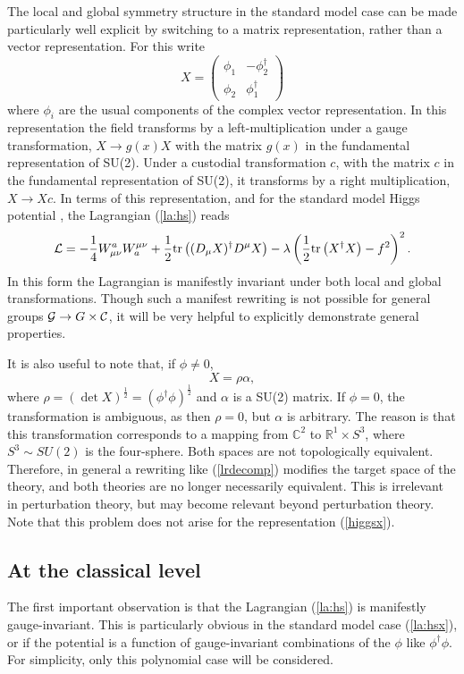 \documentclass[final,12pt]{article}
\newcommand*{\La}{{\cal{L}}}
\newcommand*{\no}{\noindent}
\newcommand*{\be}{\begin{equation}}
\newcommand*{\ee}{\end{equation}}
\newcommand*{\pref}[1]{(\ref{#1})}
\newcommand*{\mn}{{\mu\nu}}
\newcommand*{\tr}{\mathrm{tr}}
\newcommand*{\1}{1\!\!\!\bot}
\newcommand*{\bma}{\begin{matrix}}
\newcommand*{\ema}{\end{matrix}}
\newcommand*{\bpm}{\left(\bma}
\newcommand*{\epm}{\ema\right)}
\newcommand*{\rn}{\mathbb{R}}
\newcommand*{\cn}{\mathbb{C}}
\begin{document}
The local and global symmetry structure in the standard model case can be made particularly well explicit by switching to a matrix representation, rather than a vector representation. For this write \cite{Shifman:2012zz}
\be
X=\bpm \phi_1 & -\phi_2^\dagger\\ \phi_2 & \phi_1^\dagger \epm\label{higgsx}
\ee
\no where $\phi_i$ are the usual components of the complex vector representation. In this representation the field transforms by a left-multiplication under a gauge transformation, $X\to g(x)X$ with the matrix $g(x)$ in the fundamental representation of SU(2). Under a custodial transformation $c$, with the matrix $c$ in the fundamental representation of SU(2), it transforms by a right multiplication, $X\to X c$. In terms of this representation, and for the standard model Higgs potential \cite{Bohm:2001yx}, the Lagrangian \pref{la:hs} reads \cite{Shifman:2012zz}
\be
\La=-\frac{1}{4}W_\mn^aW^\mn_a+\frac{1}{2}\tr\left((D_\mu X)^\dagger D^\mu X\right)-\lambda\left(\frac{1}{2}\tr\left(X^\dagger X\right)-f^2\right)^2\label{la:hsx}.
\ee
\no In this form the Lagrangian is manifestly invariant under both local and global transformations. Though such a manifest rewriting is not possible for general groups ${\cal G}\to G\times{\cal C}$, it will be very helpful to explicitly demonstrate general properties.

It is also useful to note that, if $\phi\neq 0$,
\be
X=\rho\alpha\label{lrdecomp},
\ee
\no where $\rho=(\det X)^\frac{1}{2}=(\phi^\dagger\phi)^\frac{1}{2}$ and $\alpha$ is a SU(2) matrix. If $\phi=0$, the transformation is ambiguous, as then $\rho=0$, but $\alpha$ is arbitrary. The reason is that this transformation corresponds to a mapping from $\cn^2$ to $\rn^1\times S^3$, where $S^3\sim SU(2)$ is the four-sphere. Both spaces are not topologically equivalent. Therefore, in general a rewriting like \pref{lrdecomp} modifies the target space of the theory, and both theories are no longer necessarily equivalent. This is irrelevant in perturbation theory, but may become relevant beyond perturbation theory. Note that this problem does not arise for the representation \pref{higgsx}.

\subsection{At the classical level}\label{ss:morse}

The first important observation is that the Lagrangian \pref{la:hs} is manifestly gauge-invariant. This is particularly obvious in the standard model case \pref{la:hsx}, or if the potential is a function of gauge-invariant combinations of the $\phi$ like $\phi^\dagger\phi$. For simplicity, only this polynomial case will be considered.
\end{document}
